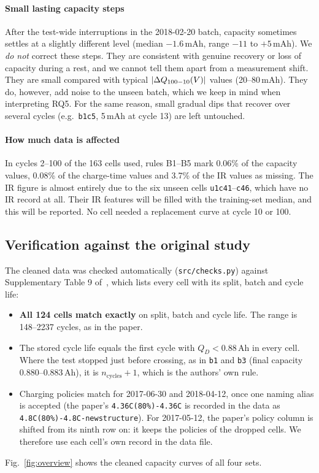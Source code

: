 \paragraph{Small lasting capacity steps}
After the test-wide interruptions in the 2018-02-20 batch, capacity
sometimes settles at a slightly different level (median $-1.6$\,mAh, range
$-11$ to $+5$\,mAh). We \emph{do not} correct these steps. They are
consistent with genuine recovery or loss of capacity during a rest, and we
cannot tell them apart from a measurement shift. They are small compared
with typical $|\Delta Q_{100-10}(V)|$ values (20--80\,mAh). They do, however, add noise to
the unseen batch, which we keep in mind when interpreting RQ5. For the same
reason, small gradual dips that recover over several cycles (e.g.\
\texttt{b1c5}, 5\,mAh at cycle 13) are left untouched.

\paragraph{How much data is affected}
In cycles 2--100 of the 163 cells used, rules B1--B5 mark 0.06\% of the
capacity values, 0.08\% of the charge-time values and 3.7\% of the IR
values as missing. The IR figure is almost entirely due to the six unseen
cells \texttt{u1c41}--\texttt{c46}, which have no IR record at all. Their IR
features will be filled with the training-set median, and this will be
reported. No cell needed a replacement curve at cycle 10 or 100.

\subsection{Verification against the original study}
The cleaned data was checked automatically (\texttt{src/checks.py}) against
Supplementary Table 9 of~\cite{severson2019}, which lists every cell with
its split, batch and cycle life:
\begin{itemize}
  \item \textbf{All 124 cells match exactly} on split, batch and cycle life.
  The range is 148--2237 cycles, as in the paper.
  \item The stored cycle life equals the first cycle with $Q_D<0.88$\,Ah in
  every cell. Where the test stopped just before crossing, as in
  \texttt{b1} and \texttt{b3} (final capacity 0.880--0.883\,Ah), it is
  $n_\text{cycles}+1$, which is the authors' own rule.
  \item Charging policies match for 2017-06-30 and 2018-04-12, once one
  naming alias is accepted (the paper's \texttt{4.36C(80\%)-4.36C} is
  recorded in the data as \texttt{4.8C(80\%)-4.8C-newstructure}). For
  2017-05-12, the paper's policy column is shifted from its ninth row on:
  it keeps the policies of the dropped cells. We therefore use each cell's
  own record in the data file.
\end{itemize}
Fig.~\ref{fig:overview} shows the cleaned capacity curves of all four sets.

